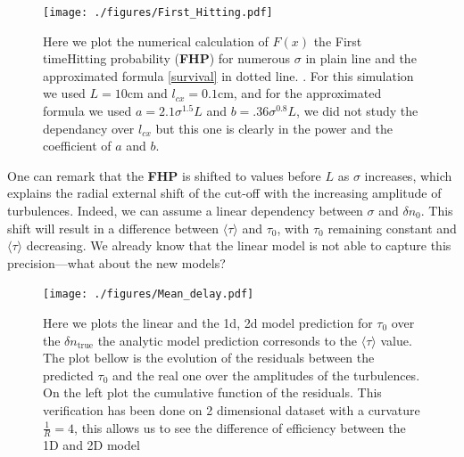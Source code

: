 \documentclass[11pt,openany]{report}
\begin{document}
\begin{multicols}{2}
    \begin{figure}[H]
        \centering
        \texttt{[image: ./figures/First\_Hitting.pdf]}
        \caption{Here we plot the numerical calculation of $F(x)$ the First timeHitting probability (\textbf{FHP}) for numerous $\sigma$ in plain line  and the approximated formula \eqref{survival} in dotted line. . For this simulation we used $L = 10$cm and $l_{cx} = 0.1$cm, and for the approximated formula we used $a = 2.1 \sigma^{1.5}L$ and $b = .36\sigma^{0.8} L$, we did not study the dependancy over $l_{cx}$ but this one is clearly in the power and the coefficient of $a$ and $b$.}
        \label{fig:FHP}

    \end{figure}One can remark that the \textbf{FHP} is shifted to values before \( L \) as \( \sigma \) increases, which explains the radial external shift of the cut-off with the increasing amplitude of turbulences. Indeed, we can assume a linear dependency between \( \sigma \) and \( \delta n_0 \). This shift will result in a difference between \( \langle \tau \rangle \) and \( \tau_0 \), with \( \tau_0 \) remaining constant and \( \langle \tau \rangle \) decreasing. We already know that the linear model is not able to capture this precision—what about the new models?
    \begin{figure}[H]
        \centering
        \hspace*{-1.4cm}\texttt{[image: ./figures/Mean\_delay.pdf]}
        \caption{Here we plots the linear and the 1d, 2d model prediction for $\tau_0$ over the $\delta n_{\text{true}}$ the analytic model prediction corresonds to the $\langle \tau \rangle$ value. The plot bellow is the evolution of the residuals between the predicted $\tau_0$ and the real one over the amplitudes of the turbulences. On the left plot the cumulative function of the residuals. This verification has been done on 2 dimensional dataset with a curvature $\frac{1}{R} = 4$, this allows us to see the difference of efficiency between the 1D and 2D model}
        \label{fig:mean_delay}
    \end{figure}


\end{multicols}
\end{document}
